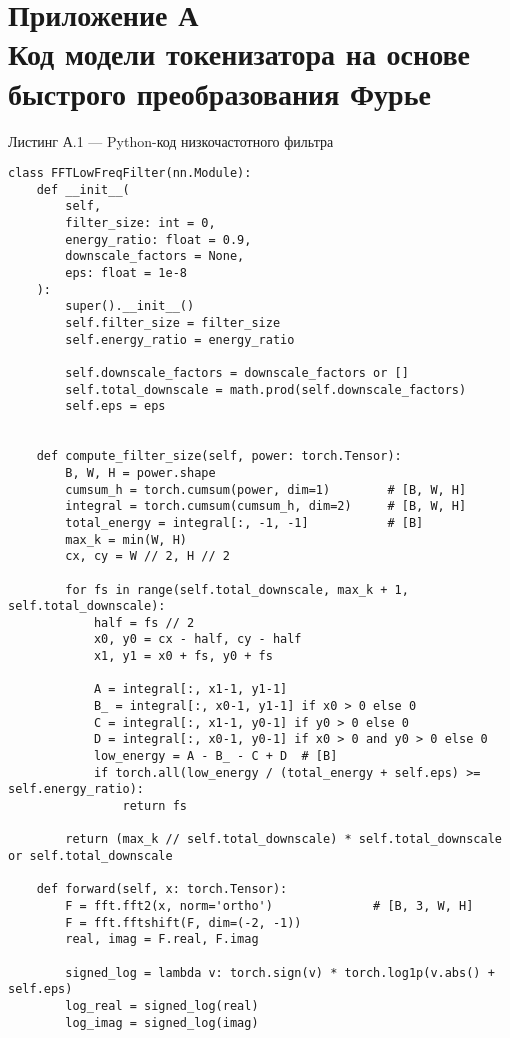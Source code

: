 \appendix
\section*{Приложение А\\Код модели токенизатора на основе быстрого преобразования Фурье}

\noindent Листинг А.1 — Python-код низкочастотного фильтра
{\scriptsize
\begin{verbatim}
class FFTLowFreqFilter(nn.Module):
    def __init__(
        self,
        filter_size: int = 0,
        energy_ratio: float = 0.9,
        downscale_factors = None,
        eps: float = 1e-8
    ):
        super().__init__()
        self.filter_size = filter_size
        self.energy_ratio = energy_ratio

        self.downscale_factors = downscale_factors or []
        self.total_downscale = math.prod(self.downscale_factors)
        self.eps = eps


    def compute_filter_size(self, power: torch.Tensor):
        B, W, H = power.shape
        cumsum_h = torch.cumsum(power, dim=1)        # [B, W, H]
        integral = torch.cumsum(cumsum_h, dim=2)     # [B, W, H]
        total_energy = integral[:, -1, -1]           # [B]
        max_k = min(W, H)
        cx, cy = W // 2, H // 2

        for fs in range(self.total_downscale, max_k + 1, self.total_downscale):
            half = fs // 2
            x0, y0 = cx - half, cy - half
            x1, y1 = x0 + fs, y0 + fs

            A = integral[:, x1-1, y1-1]
            B_ = integral[:, x0-1, y1-1] if x0 > 0 else 0
            C = integral[:, x1-1, y0-1] if y0 > 0 else 0
            D = integral[:, x0-1, y0-1] if x0 > 0 and y0 > 0 else 0
            low_energy = A - B_ - C + D  # [B]
            if torch.all(low_energy / (total_energy + self.eps) >= self.energy_ratio):
                return fs

        return (max_k // self.total_downscale) * self.total_downscale or self.total_downscale

    def forward(self, x: torch.Tensor):
        F = fft.fft2(x, norm='ortho')              # [B, 3, W, H]
        F = fft.fftshift(F, dim=(-2, -1))
        real, imag = F.real, F.imag

        signed_log = lambda v: torch.sign(v) * torch.log1p(v.abs() + self.eps)
        log_real = signed_log(real)
        log_imag = signed_log(imag)


\end{verbatim}}
